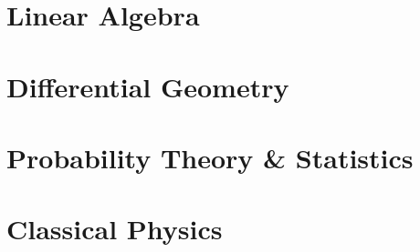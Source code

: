 \documentclass[12pt, a4paper]{report}
\begin{document}







\part{Linear Algebra}
\insertparttoc









\part{Differential Geometry}\label{part:diffgeom}
\insertparttoc

















\part{Probability Theory \& Statistics}
\insertparttoc









\part{Classical Physics}
\insertparttoc





\end{document}
